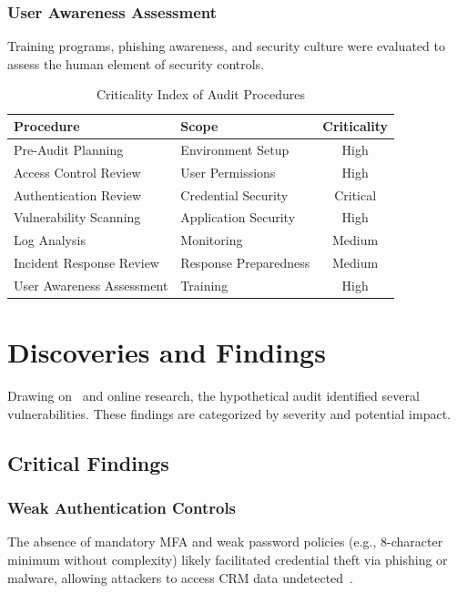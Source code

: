 \documentclass[12pt,a4paper]{article}
\begin{document}
\subsubsection{User Awareness Assessment}
Training programs, phishing awareness, and security culture were evaluated to assess the human element of security controls.

\begin{table}[H]
\caption{Criticality Index of Audit Procedures}
\label{tab:procedures}
\centering
\begin{tabularx}{\textwidth}{|X|l|c|}
\hline
\rowcolor{primary!20}
\textbf{Procedure} & \textbf{Scope} & \textbf{Criticality} \\
\hline
Pre-Audit Planning & Environment Setup & High \\
\rowcolor{highlight!10}
Access Control Review & User Permissions & High \\
\rowcolor{highlight!20}
Authentication Review & Credential Security & Critical \\
\rowcolor{highlight!10}
Vulnerability Scanning & Application Security & High \\
Log Analysis & Monitoring & Medium \\
Incident Response Review & Response Preparedness & Medium \\
User Awareness Assessment & Training & High \\
\hline
\end{tabularx}
\end{table}

\section{Discoveries and Findings}
Drawing on~\cite{reliaquest2025} and online research, the hypothetical audit identified several vulnerabilities. These findings are categorized by severity and potential impact.

\subsection{Critical Findings}
\subsubsection{Weak Authentication Controls}
The absence of mandatory MFA and weak password policies (e.g., 8-character minimum without complexity) likely facilitated credential theft via phishing or malware, allowing attackers to access CRM data undetected~\cite{reliaquest2025}.
\end{document}

